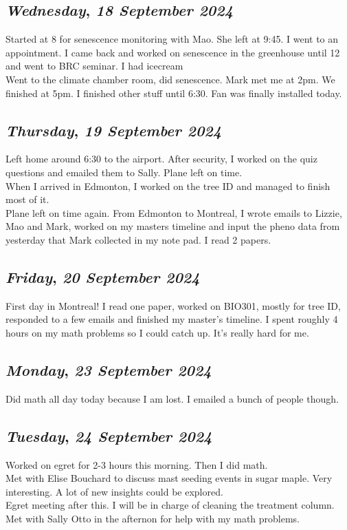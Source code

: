 \def\day{\textit{18 September 2024}}
\def\weekday{\textit{Wednesday}}
\subsection*{\weekday, \day}
Started at 8 for senescence monitoring with Mao. She left at 9:45. I went to an appointment. I came back and worked on senescence in the greenhouse until 12 and went to BRC seminar. I had icecream\\
Went to the climate chamber room, did senescence. Mark met me at 2pm. We finished at 5pm. I finished other stuff until 6:30. Fan was finally installed today. 

\def\day{\textit{19 September 2024}}
\def\weekday{\textit{Thursday}}
\subsection*{\weekday, \day}
Left home around 6:30 to the airport. After security, I worked on the quiz questions and emailed them to Sally. Plane left on time. \\
When I arrived in Edmonton, I worked on the tree ID and managed to finish most of it.\\
Plane left on time again. From Edmonton to Montreal, I wrote emails to Lizzie, Mao and Mark, worked on my masters timeline and input the pheno data from yesterday that Mark collected in my note pad. I read 2 papers. 

\def\day{\textit{20 September 2024}}
\def\weekday{\textit{Friday}}
\subsection*{\weekday, \day}
First day in Montreal! I read one paper, worked on BIO301, mostly for tree ID, responded to a few emails and finished my master's timeline. I spent roughly 4 hours on my math problems so I could catch up. It's really hard for me. 

\def\day{\textit{23 September 2024}}
\def\weekday{\textit{Monday}}
\subsection*{\weekday, \day}
Did math all day today because I am lost. I emailed a bunch of people though.  

\def\day{\textit{24 September 2024}}
\def\weekday{\textit{Tuesday}}
\subsection*{\weekday, \day}
Worked on egret for 2-3 hours this morning. Then I did math.\\
Met with Elise Bouchard to discuss mast seeding events in sugar maple. Very interesting. A lot of new insights could be explored. \\
Egret meeting after this. I will be in charge of cleaning the treatment column.\\ 
Met with Sally Otto in the afternon for help with my math problems. 

